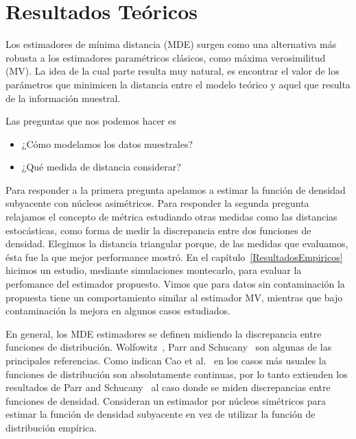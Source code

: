 
\chapter{Resultados Teóricos}
\label{ResultadosTeoricos}

Los estimadores de mínima distancia (MDE) surgen como una alternativa más robusta a los estimadores paramétricos clásicos, como máxima verosimilitud (MV). La idea de la cual parte resulta muy natural, es encontrar el valor de los parámetros que minimicen la distancia entre el modelo teórico y aquel que resulta de la información muestral.

Las preguntas que nos podemos hacer es 
\begin{itemize}
	\item ¿Cómo modelamos los datos muestrales?
	\item ¿Qué medida de distancia considerar?
\end{itemize}

Para responder a la primera pregunta apelamos a estimar la función de densidad subyacente con núcleos asimétricos. Para responder la segunda pregunta relajamos el concepto de métrica estudiando otras medidas como las distancias estocásticas, como forma de medir la discrepancia entre dos funciones de densidad. Elegimos la distancia triangular porque, de las medidas que evaluamos, ésta fue la que mejor performance mostró. En el capítulo~\ref{ResultadosEmpiricos} hicimos un estudio, mediante simulaciones montecarlo, para evaluar la perfomance del estimador propuesto. Vimos que para datos sin contaminación la propuesta tiene un comportamiento similar al estimador MV, mientras que bajo contaminación la mejora en algunos casos estudiados.

En general, los MDE estimadores se definen midiendo la discrepancia entre funciones de distribución. Wolfowitz~\cite{Wolfowitz1954}, Parr and Schucany~\cite{Parr1980} son algunas de las principales referencias. Como indican Cao et al.~\cite{cao1995minimum} en los casos más usuales la funciones de distribución son absolutamente continuas, por lo tanto extienden los resultados de Parr and Schucany~\cite{parr1982} al caso donde se miden discrepancias entre funciones de densidad. Consideran un estimador por núcleos simétricos para estimar la función de densidad subyacente en vez de utilizar la función de distribución empírica.

